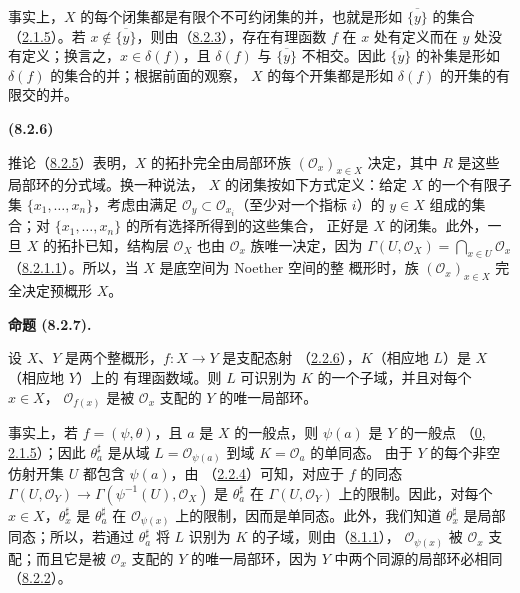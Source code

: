 \documentclass[UTF8,fontset=none,11pt,oneside,openany]{ctexbook}
\newenvironment{env}[1][]{%
  \par\medskip\noindent\textbf{(#1)}\ %
}{\par}
\newenvironment{proposition}[1][]{%
  \par\medskip\noindent\textbf{命题 (#1).}\ %
}{\par}
\let\EGAOriginalLabel\label
\renewcommand{\label}[1]{\phantomsection\EGAOriginalLabel{#1}}
\begin{document}
事实上，$X$ 的每个闭集都是有限个不可约闭集的并，也就是形如
$\overline{\{y\}}$ 的集合（\hyperref[I.2.1.5-fr]{2.1.5}）。若
$x\notin\overline{\{y\}}$，则由（\hyperref[I.8.2.3-fr]{8.2.3}），存在有理函数
$f$ 在 $x$ 处有定义而在 $y$ 处没有定义；换言之，$x\in\delta(f)$，且
$\delta(f)$ 与 $\overline{\{y\}}$ 不相交。因此
$\overline{\{y\}}$ 的补集是形如 $\delta(f)$ 的集合的并；根据前面的观察，
$X$ 的每个开集都是形如 $\delta(f)$ 的开集的有限交的并。

\begin{env}[8.2.6]
\label{I.8.2.6-fr}
推论（\hyperref[I.8.2.5-fr]{8.2.5}）表明，$X$ 的拓扑完全由局部环族
$(\mathscr{O}_x)_{x\in X}$ 决定，其中 $R$ 是这些局部环的分式域。换一种说法，
$X$ 的闭集按如下方式定义：给定 $X$ 的一个有限子集
$\{x_1,\ldots,x_n\}$，考虑由满足
$\mathscr{O}_y\subset\mathscr{O}_{x_i}$（至少对一个指标 $i$）的
$y\in X$ 组成的集合；对 $\{x_1,\ldots,x_n\}$ 的所有选择所得到的这些集合，
正好是 $X$ 的闭集。此外，一旦 $X$ 的拓扑已知，结构层
$\mathscr{O}_X$ 也由 $\mathscr{O}_x$ 族唯一决定，因为
$\Gamma(U,\mathscr{O}_X)=\bigcap_{x\in U}\mathscr{O}_x$
（\hyperref[I.8.2.1.1-fr]{8.2.1.1}）。所以，当 $X$ 是底空间为 Noether 空间的整
概形时，族 $(\mathscr{O}_x)_{x\in X}$ 完全决定预概形 $X$。
\end{env}

\begin{proposition}[8.2.7]
\label{I.8.2.7-fr}
设 $X$、$Y$ 是两个整概形，$f:X\to Y$ 是支配态射
（\hyperref[I.2.2.6-fr]{2.2.6}），$K$（相应地 $L$）是 $X$（相应地 $Y$）上的
有理函数域。则 $L$ 可识别为 $K$ 的一个子域，并且对每个 $x\in X$，
$\mathscr{O}_{f(x)}$ 是被 $\mathscr{O}_x$ 支配的 $Y$ 的唯一局部环。
\end{proposition}

事实上，若 $f=(\psi,\theta)$，且 $a$ 是 $X$ 的一般点，则
$\psi(a)$ 是 $Y$ 的一般点
（\hyperref[0.2.1.5-fr]{0, 2.1.5}）；因此
$\theta_a^\sharp$ 是从域 $L=\mathscr{O}_{\psi(a)}$ 到域 $K=\mathscr{O}_a$ 的单同态。
由于 $Y$ 的每个非空仿射开集 $U$ 都包含 $\psi(a)$，由
（\hyperref[I.2.2.4-fr]{2.2.4}）可知，对应于 $f$ 的同态
$\Gamma(U,\mathscr{O}_Y)\to\Gamma(\psi^{-1}(U),\mathscr{O}_X)$
是 $\theta_a^\sharp$ 在 $\Gamma(U,\mathscr{O}_Y)$ 上的限制。因此，对每个
$x\in X$，$\theta_x^\sharp$ 是 $\theta_a^\sharp$ 在
$\mathscr{O}_{\psi(x)}$ 上的限制，因而是单同态。此外，我们知道
$\theta_x^\sharp$ 是局部同态；所以，若通过 $\theta_a^\sharp$ 将 $L$ 识别为
$K$ 的子域，则由（\hyperref[I.8.1.1-fr]{8.1.1}），
$\mathscr{O}_{\psi(x)}$ 被 $\mathscr{O}_x$ 支配；而且它是被
$\mathscr{O}_x$ 支配的 $Y$ 的唯一局部环，因为 $Y$ 中两个同源的局部环必相同
（\hyperref[I.8.2.2-fr]{8.2.2}）。
\end{document}
